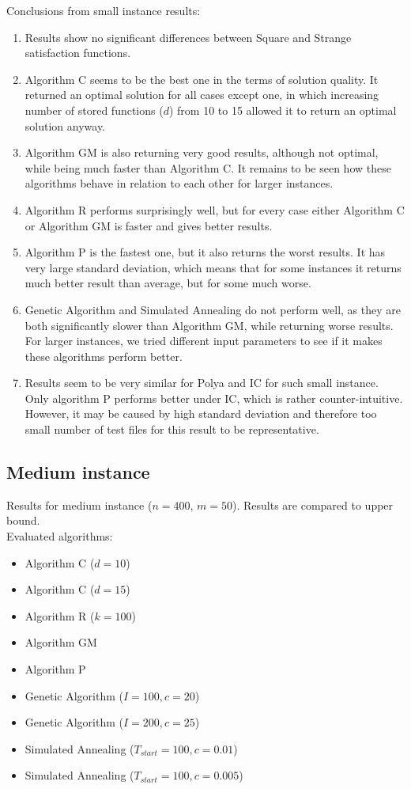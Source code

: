Conclusions from small instance results:
\begin{enumerate}
	\item Results show no significant differences between Square and Strange satisfaction functions.
	\item Algorithm C seems to be the best one in the terms of solution quality. It returned an optimal solution for all cases except one, in which increasing number of stored functions ($d$) from 10 to 15 allowed it to return an optimal solution anyway.
	\item Algorithm GM is also returning very good results, although not optimal, while being much faster than Algorithm C. It remains to be seen how these algorithms behave in relation to each other for larger instances.
	\item Algorithm R performs surprisingly well, but for every case either Algorithm C or Algorithm GM is faster and gives better results.
	\item Algorithm P is the fastest one, but it also returns the worst results. It has very large standard deviation, which means that for some instances it returns much better result than average, but for some much worse.
	\item Genetic Algorithm and Simulated Annealing do not perform well, as they are both significantly slower than Algorithm GM, while returning worse results. For larger instances, we tried different input parameters to see if it makes these algorithms perform better.
	\item Results seem to be very similar for Polya and IC for such small instance. Only algorithm P performs better under IC, which is rather counter-intuitive. However, it may be caused by high standard deviation and therefore too small number of test files for this result to be representative.
\end{enumerate}

\subsection{Medium instance}

Results for medium instance ($n = 400$, $m = 50$). Results are compared to upper bound.
\\

Evaluated algorithms:
\begin{itemize}
	\item Algorithm C ($d = 10$)
	\item Algorithm C ($d = 15$)
	\item Algorithm R ($k = 100$)
	\item Algorithm GM
	\item Algorithm P
	\item Genetic Algorithm ($I = 100, c = 20$)
	\item Genetic Algorithm ($I = 200, c = 25$)
	\item Simulated Annealing ($T_{start} = 100, c = 0.01$)
	\item Simulated Annealing ($T_{start} = 100, c = 0.005$)
\end{itemize}

